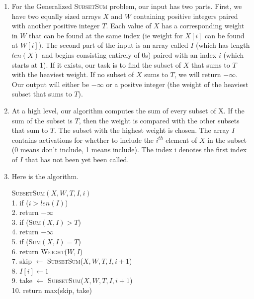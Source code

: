 \documentclass{article}
\begin{document}

\begin{enumerate}
    \item For the Generalized \textsc{SubsetSum} problem, our input has two parts.
    First, we have two equally sized arrays $X$ and $W$ containing positive integers paired with another positive integer $T$.
    Each value of $X$ has a corresponding weight in $W$ that can be found at the same index (ie weight for $X[i]$ can be found at $W[i]$).
    The second part of the input is an array called $I$ (which has length $len(X)$ and begins consisting entirely of 0s) paired with an index $i$ (which starts at 1).
    If it exists, our task is to find the subset of $X$ that sums to $T$ with the heaviest weight.
    If no subset of $X$ sums to $T$, we will return $-\infty$.
    Our output will either be $-\infty$ or a positve integer (the weight of the heaviest subset that sums to $T$).
    \item At a high level, our algorithm computes the sum of every subset of X.
    If the sum of the subset is $T$, then the weight is compared with the other subsets that sum to $T$.
    The subset with the highest weight is chosen. \parspace
    The array $I$ contains activations for whether to include the $i^{th}$ element of $X$ in the subset (0 means don't include, 1 means include).
    The index i denotes the first index of $I$ that has not been yet been called.
    \item Here is the algorithm.
    \begin{algorithm}
        \textsc{SubsetSum}$(X, W, T, I, i)$ \\
        1.  \hspace{0em} if ($i > len(I)$) \\
        2.  \hspace{2em}     return $-\infty$ \\
        3.  \hspace{0em} if (\textsc{Sum}$(X, I) > T$) \\
        4.  \hspace{2em}     return $-\infty$ \\
        5.  \hspace{0em} if (\textsc{Sum}$(X, I) = T$) \\
        6.  \hspace{2em}     return \textsc{Weight}($W, I$) \\
        7.  \hspace{0em} skip $\leftarrow$ \textsc{SubsetSum}($X, W, T, I, i+1$) \\
        8.  \hspace{0em} $I[i] \leftarrow 1$ \\
        9.  \hspace{0em} take $\leftarrow$ \textsc{SubsetSum}($X, W, T, I, i+1$) \\
        10. return max(skip, take) \\


\end{algorithm}
\end{enumerate}
\end{document}
